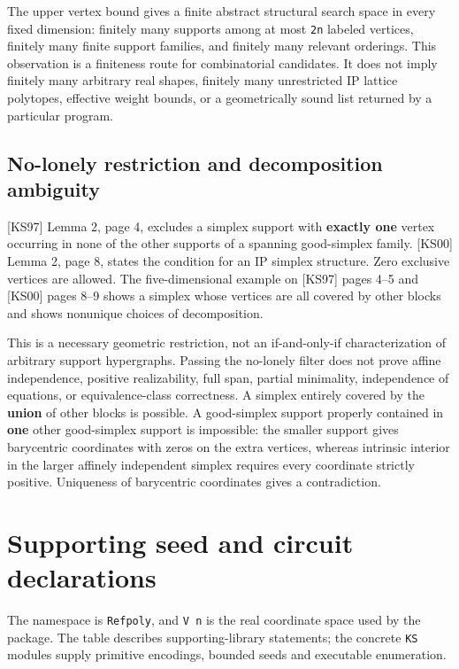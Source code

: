\documentclass[11pt,a4paper,oneside]{report}
\begin{document}
The upper vertex bound gives a finite abstract structural search space
in every fixed dimension: finitely many supports among at most
\texttt{2n} labeled vertices, finitely many finite support families, and
finitely many relevant orderings. This observation is a finiteness route
for combinatorial candidates. It does not imply finitely many arbitrary
real shapes, finitely many unrestricted IP lattice polytopes, effective
weight bounds, or a geometrically sound list returned by a particular
program.

\subsection{No-lonely restriction and decomposition
ambiguity}\label{minimal-ip-circuits-and-types--no-lonely-restriction-and-decomposition-ambiguity}

{[}KS97{]} Lemma 2, page 4, excludes a simplex support with
\textbf{exactly one} vertex occurring in none of the other supports of a
spanning good-simplex family. {[}KS00{]} Lemma 2, page 8, states the
condition for an IP simplex structure. Zero exclusive vertices are
allowed. The five-dimensional example on {[}KS97{]} pages 4--5 and
{[}KS00{]} pages 8--9 shows a simplex whose vertices are all covered by
other blocks and shows nonunique choices of decomposition.

This is a necessary geometric restriction, not an if-and-only-if
characterization of arbitrary support hypergraphs. Passing the no-lonely
filter does not prove affine independence, positive realizability, full
span, partial minimality, independence of equations, or
equivalence-class correctness. A simplex entirely covered by the
\textbf{union} of other blocks is possible. A good-simplex support
properly contained in \textbf{one} other good-simplex support is
impossible: the smaller support gives barycentric coordinates with zeros
on the extra vertices, whereas intrinsic interior in the larger affinely
independent simplex requires every coordinate strictly positive.
Uniqueness of barycentric coordinates gives a contradiction.

\section{Supporting seed and circuit
declarations}\label{minimal-ip-circuits-and-types--supporting-seed-and-circuit-declarations}

The namespace is \texttt{Refpoly}, and \texttt{V n} is the real
coordinate space used by the package. The table describes
supporting-library statements; the concrete \texttt{KS} modules supply
primitive encodings, bounded seeds and executable enumeration.
\end{document}
